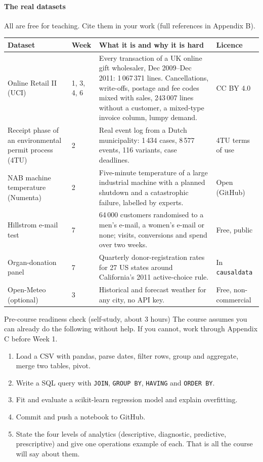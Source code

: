 \paragraph{The real datasets} All are free for teaching. Cite them in your work (full references in Appendix B).
\begin{center}\small
\begin{tabularx}{\linewidth}{@{}L{3.3cm}L{0.9cm}Y L{2.2cm}@{}}
\toprule
\textbf{Dataset} & \textbf{Week} & \textbf{What it is and why it is hard} & \textbf{Licence}\\\midrule
Online Retail II (UCI) & 1, 3, 4, 6 & Every transaction of a UK online gift wholesaler, Dec 2009--Dec 2011: 1\,067\,371 lines. Cancellations, write-offs, postage and fee codes mixed with sales, 243\,007 lines without a customer, a mixed-type invoice column, lumpy demand. & CC BY 4.0\\
Receipt phase of an environmental permit process (4TU) & 2 & Real event log from a Dutch municipality: 1\,434 cases, 8\,577 events, 116 variants, case deadlines. & 4TU terms of use\\
NAB machine temperature (Numenta) & 2 & Five-minute temperature of a large industrial machine with a planned shutdown and a catastrophic failure, labelled by experts. & Open (GitHub)\\
Hillstrom e-mail test & 7 & 64\,000 customers randomised to a men's e-mail, a women's e-mail or none; visits, conversions and spend over two weeks. & Free, public\\
Organ-donation panel & 7 & Quarterly donor-registration rates for 27 US states around California's 2011 active-choice rule. & In \texttt{causaldata}\\
Open-Meteo (optional) & 3 & Historical and forecast weather for any city, no API key. & Free, non-commercial\\\bottomrule
\end{tabularx}
\end{center}

\begin{insight}{Pre-course readiness check (self-study, about 3 hours)}
The course assumes you can already do the following without help. If you cannot, work through Appendix C before
Week 1.
\begin{enumerate}[nosep]
\item Load a CSV with pandas, parse dates, filter rows, group and aggregate, merge two tables, pivot.
\item Write a SQL query with \texttt{JOIN}, \texttt{GROUP BY}, \texttt{HAVING} and \texttt{ORDER BY}.
\item Fit and evaluate a scikit-learn regression model and explain overfitting.
\item Commit and push a notebook to GitHub.
\item State the four levels of analytics (descriptive, diagnostic, predictive, prescriptive) and give one
operations example of each. That is all the course will say about them.
\end{enumerate}
\end{insight}
